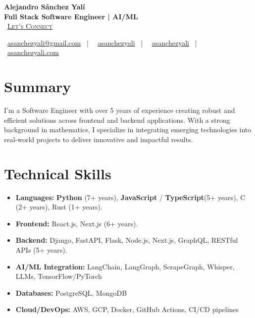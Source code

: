 \documentclass[letterpaper,11pt]{article}
\newcommand{\normalfaCalendar}{{\mdseries\faCalendar}}
\newcommand{\normalfaEnvelope}{{\mdseries\faEnvelope}}
\newcommand{\normalfaLinkedin}{{\mdseries\faLinkedin}}
\newcommand{\normalfaGithub}{{\mdseries\faGithub}}
\newcommand{\normalfaGlobe}{{\mdseries\faGlobe}}
\begin{document}
\begin{center}
\textbf{\Huge Alejandro Sánchez Yalí}\\[0.2em]
\textbf{\Large Full Stack Software Engineer | AI/ML}\\[0.4em]
\small
\normalfaCalendar\ \href{https://cal.com/asanchezyali/full-time-opportunities}{\textsc{Let's Connect}}

\vspace{0.8em}
\normalfaEnvelope\ \href{mailto:asanchezyali@gmail.com}{asanchezyali@gmail.com}  ~|~
\normalfaLinkedin\ \href{https://www.linkedin.com/in/asanchezyali}{asanchezyali} ~|~
\normalfaGithub\ \href{https://github.com/asanchezyali}{asanchezyali}  ~|~
\normalfaGlobe\ \href{https://asanchezyali.com}{asanchezyali.com}
\end{center}

\section{Summary}
I'm a Software Engineer with over 5 years of experience creating robust and efficient solutions across frontend and backend applications. With a strong background in mathematics, I specialize in integrating emerging technologies into real-world projects to deliver innovative and impactful results.

\section{Technical Skills}
\begin{itemize}[leftmargin=*, itemsep=0pt]
  \item \textbf{Languages:} \textbf{Python} (7+ years), \textbf{JavaScript} / \textbf{TypeScript}(5+ years), C (2+ years), Rust (1+ years).
  \item \textbf{Frontend:} React.js, Next.js (6+ years).
  \item \textbf{Backend:} Django, FastAPI, Flask, Node.js, Next.js, GraphQL,  RESTful APIs (5+ years).
  \item \textbf{AI/ML Integration:} LangChain, LangGraph, ScrapeGraph, Whisper, LLMs, TensorFlow/PyTorch
  \item \textbf{Databases:} PostgreSQL, MongoDB
  \item \textbf{Cloud/DevOps:} AWS, GCP, Docker, GitHub Actions, CI/CD pipelines
\end{itemize}
\end{document}
